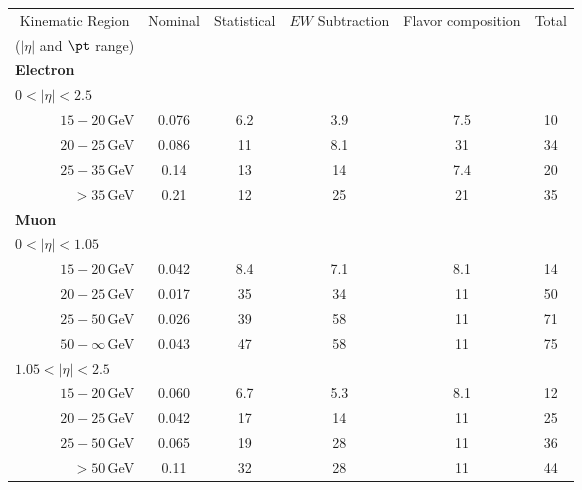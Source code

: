 \begin{tabular}{c|c|c|c|c|c}
    \toprule
    Kinematic Region                        & Nominal & Statistical & $EW$ Subtraction & Flavor composition & Total \\
    ($|\eta|$ and $\pt$ range)              &       &             &                &                    &       \\
    \midrule
    \multicolumn{1}{l|}{\textbf{Electron}} &       &             &                &                    &       \\
    \multicolumn{1}{l|}{$0<|\eta|<2.5$}   &       &             &                &                    &       \\
    \multicolumn{1}{r|}{$15-20$\,GeV}    & 0.076 & 6.2         & 3.9            & 7.5                & 10    \\
    \multicolumn{1}{r|}{$20-25$\,GeV}    & 0.086 & 11          & 8.1            & 31                 & 34    \\
    \multicolumn{1}{r|}{$25-35$\,GeV}    & 0.14  & 13          & 14             & 7.4                & 20    \\
    \multicolumn{1}{r|}{$> 35$\,GeV} & 0.21  & 12          & 25             & 21                 & 35    \\
    \midrule
    \multicolumn{1}{l|}{\textbf{Muon}}     &       &             &                &                    &       \\
    \multicolumn{1}{l|}{$0<|\eta|<1.05$}  &       &             &                &                    &       \\
    \multicolumn{1}{r|}{$15-20$\,GeV}    & 0.042 & 8.4         & 7.1            & 8.1                & 14    \\
    \multicolumn{1}{r|}{$20-25$\,GeV}    & 0.017 & 35          & 34             & 11                 & 50    \\
    \multicolumn{1}{r|}{$25-50$\,GeV}    & 0.026 & 39          & 58             & 11                 & 71    \\
    \multicolumn{1}{r|}{$50-\infty$\,GeV}  & 0.043 & 47          & 58             & 11                 & 75    \\
    \multicolumn{1}{l|}{$1.05<|\eta|<2.5$}  &       &             &                &                    &       \\
    \multicolumn{1}{r|}{$15-20$\,GeV}    & 0.060 & 6.7         & 5.3            & 8.1                & 12    \\
    \multicolumn{1}{r|}{$20-25$\,GeV}    & 0.042 & 17          & 14             & 11                 & 25    \\
    \multicolumn{1}{r|}{$25-50$\,GeV}    & 0.065 & 19          & 28             & 11                 & 36    \\
    \multicolumn{1}{r|}{$> 50$\,GeV}  & 0.11  & 32          & 28             & 11                 & 44    \\
    \bottomrule
    \end{tabular}
    